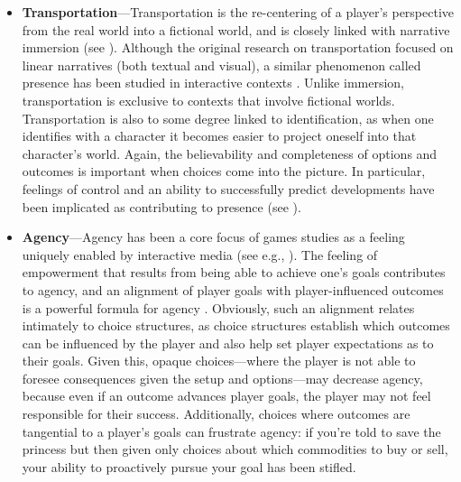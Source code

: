 \begin{itemize}
\item \textbf{Transportation}---Transportation is the re-centering of a player's perspective from the real world into a fictional world, and is closely linked with narrative immersion (see \citep{Green2000}).
%
  Although the original research on transportation focused on linear narratives (both textual and visual), a similar phenomenon called presence has been studied in interactive contexts \citep{Witmer1998}.
%
Unlike immersion, transportation is exclusive to contexts that involve fictional worlds.
%
Transportation is also to some degree linked to identification, as when one identifies with a character it becomes easier to project oneself into that character's world.
%
Again, the believability and completeness of options and outcomes is important when choices come into the picture.
%
In particular, feelings of control and an ability to successfully predict developments have been implicated as contributing to presence (see \citep{Witmer1998}).

\item \textbf{Agency}---Agency has been a core focus of games studies as a feeling uniquely enabled by interactive media (see e.g., \citep{Murray1997,Mateas2001,WardripFruin2009,Mason2013}).
%
The feeling of empowerment that results from being able to achieve one's goals contributes to agency, and an alignment of player goals with player-influenced outcomes is a powerful formula for agency \citep{Mateas2001}.
%
Obviously, such an alignment relates intimately to choice structures, as choice structures establish which outcomes can be influenced by the player and also help set player expectations as to their goals.
%
Given this, opaque choices---where the player is not able to foresee consequences given the setup and options---may decrease agency, because even if an outcome advances player goals, the player may not feel responsible for their success.
%
Additionally, choices where outcomes are tangential to a player's goals can frustrate agency: if you're told to save the princess but then given only choices about which commodities to buy or sell, your ability to proactively pursue your goal has been stifled.



\end{itemize}
